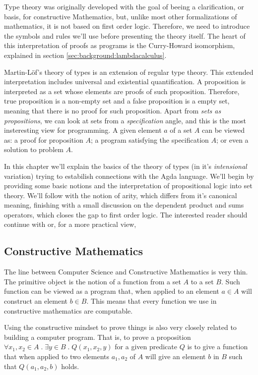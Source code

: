 Type theory was originally developed with the goal of beeing a clarification, or basis,
for constructive Mathematics, but, unlike most other formalizations of mathematics, it is
not based on first order logic. Therefore, we need to introduce the symbols and
rules we'll use before presenting the theory itself. The heart of this interpretation of
proofs as programs is the Curry-Howard isomorphism, explained in section \ref{sec:background:lambdacalculus}.

Martin-L\"{o}f's theory of types \cite{lof84} is an extension of regular type theory. This extended
interpretation includes universal and existential quantification. 
A proposition is interpreted as a set whose elements
are proofs of such proposition. Therefore, true proposition is a non-empty set and a false proposition
is a empty set, meaning that there is no proof for such proposition. Apart from \emph{sets as propositions},
we can look at sets from a \emph{specification} angle, and this is the most insteresting view for programming.
A given element $a$ of a set $A$ can be viewed as: a proof for proposition $A$; a program satisfying the
specification $A$; or even a solution to problem $A$.

In this chapter we'll explain the basics of the theory of types (in it's \emph{intensional} variation)
trying to estabilish connections with the Agda language. We'll begin by providing some basic notions
and the interpretation of propositional logic into set theory. We'll follow with the notion of arity,
which differs from it's canonical meaning, finishing with a small discussion on the dependent product
and sums operators, which closes the gap to first order logic. The interested reader should continue
with \cite{nords90} or, for a more practical view, \cite{wouter08,bove2009}

\subsection{Constructive Mathematics}
\label{subsec:martinlof:constructivemathematics}

The line between Computer Science and Constructive Mathematics is very thin. The primitive object is
the notion of a function from a set $A$ to a set $B$. Such function can be viewed as a program that,
when applied to an element $a \in A$ will construct an element $b \in B$. This means that every
function we use in constructive mathematics are computable. 

Using the constructive mindset to prove things is also very closely related to building a computer program.
That is, to prove a proposition $\forall x_1,x_2 \in A \; . \; \exists y \in B \; . \; Q(x_1, x_2, y)$ for a given
predicate $Q$ is to give a function that when applied to two elements $a_1, a_2$ of $A$ will give an element $b$ in $B$
such that $Q(a_1, a_2, b)$ holds. 


